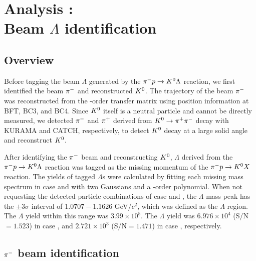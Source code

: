%

\graphicspath{{./pictures/chapter_Lbeam/}}

\chapter{Analysis : \\ Beam $\Lambda$ identification} 
\label{chap-Lbeam}

\section{Overview}
\label{sec-overview}
Before tagging the beam $\Lambda$ generated by the $\pi^- p \to K^0 \Lambda$ reaction, we first identified the beam $\pi^{-}$ and reconstructed $K^{0}$. The trajectory of the beam $\pi^{-}$ was reconstructed from the -order transfer matrix using position information at BFT, BC3, and BC4. Since $K^{0}$ itself is a neutral particle and cannot be directly measured, we detected $\pi^{-}$ and $\pi^{+}$ derived from $K^0 \to \pi^+ \pi^-$ decay with KURAMA and CATCH, respectively, to detect $K^{0}$ decay at a large solid angle and reconstruct $K^{0}$.

After identifying the $\pi^{-}$ beam and reconstructing $K^{0}$, $\Lambda$ derived from the $\pi^- p \to K^0 \Lambda$ reaction was tagged as the missing momentum of the $\pi^- p \to K^0 X$ reaction. The yields of tagged $\Lambda$s were calculated by fitting each missing mass spectrum in case  and  with two Gaussians and a -order polynomial. When not requesting the detected particle combinations of case  and , the $\Lambda$ mass peak has the $\pm3\sigma$ interval of $1.0707 - 1.1626$ GeV/$c^{2}$, which was defined as the $\Lambda$ region. The $\Lambda$ yield within this range was $3.99\times10^{5}$. The $\Lambda$ yield was $6.976\times10^{4}$ (S/N$=1.523$) in case , and $2.721\times10^{3}$ (S/N$=1.471$) in case , respectively. %

\section{$\pi^{-}$ beam identification}
